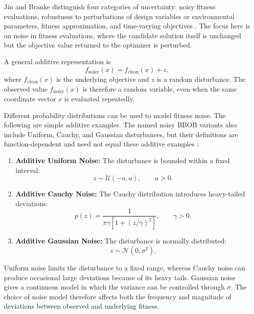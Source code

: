 Jin and Branke distinguish four categories of uncertainty: noisy fitness
evaluations, robustness to perturbations of design variables or environmental
parameters, fitness approximation, and time-varying objectives
\cite{Jin2005}. The focus here is on noise in fitness evaluations, where the
candidate solution itself is unchanged but the objective value returned to
the optimizer is perturbed.

A general additive representation is
\begin{equation}
\label{eq:noisy_evaluation_bg}
    f_{\text{noisy}}(x) = f_{\text{clean}}(x) + z,
\end{equation}
where $f_{\text{clean}}(x)$ is the underlying objective and $z$ is a random
disturbance. The observed value $f_{\text{noisy}}(x)$ is therefore a random
variable, even when the same coordinate vector $x$ is evaluated repeatedly.

Different probability distributions can be used to model fitness noise.
The following are simple additive examples. The named noisy BBOB variants
also include Uniform, Cauchy, and Gaussian disturbances, but their definitions
are function-dependent and need not equal these additive examples
\cite{Hansen2009Noisy}:

\begin{enumerate}
    \item \textbf{Additive Uniform Noise:}
    The disturbance is bounded within a fixed interval:
    \begin{equation}
        z \sim \mathcal{U}(-a,a),
        \qquad a>0.
    \end{equation}

    \item \textbf{Additive Cauchy Noise:}
    The Cauchy distribution introduces heavy-tailed deviations:
    \begin{equation}
        p(z)=
        \frac{1}{\pi\gamma\left[1+(z/\gamma)^2\right]},
        \qquad \gamma>0.
    \end{equation}

    \item \textbf{Additive Gaussian Noise:}
    The disturbance is normally distributed:
    \begin{equation}
        z \sim \mathcal{N}(0,\sigma^2).
    \end{equation}
\end{enumerate}

Uniform noise limits the disturbance to a fixed range, whereas Cauchy noise
can produce occasional large deviations because of its heavy tails.
Gaussian noise gives a continuous model in which the variance can be
controlled through $\sigma$. The choice of noise model therefore affects
both the frequency and magnitude of deviations between observed and
underlying fitness.


